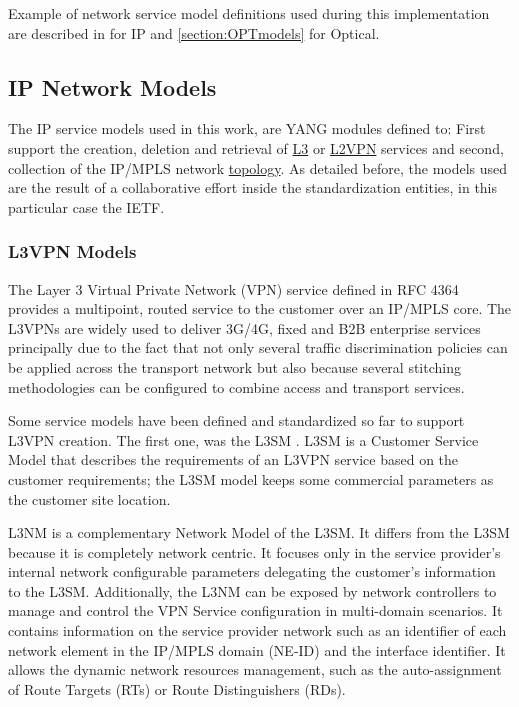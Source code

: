 \documentclass[a4paper,fleqn]{cas-dc}
\begin{document}
Example of network service model definitions used during this implementation are described in  for IP and \cref{section:OPTmodels} for Optical.

\subsection{IP Network Models}
\label{section:IPmodels}

The IP service models used in this work, are YANG modules defined to: First support the creation, deletion and retrieval of \hyperref[section:l3nm]{L3} or \hyperref[section:l2nm]{L2VPN} services and second, collection of the IP/MPLS network \hyperref[subsection:IPtopo]{topology}. As detailed before, the models used are the result of a collaborative effort inside the standardization entities, in this particular case the IETF.

\subsubsection{L3VPN Models}
\label{section:l3nm}
The Layer 3 Virtual Private Network (VPN) service defined in RFC 4364 \cite{rosen2006rfc} provides a multipoint, routed service to the customer over an IP/MPLS core. The L3VPNs are widely used to deliver 3G/4G, fixed and B2B enterprise services principally due to the fact that not only several traffic discrimination policies can be applied across the transport network but also because several stitching methodologies can be configured to combine access and transport services. 

Some service models have been defined and standardized so far to support L3VPN creation. The first one, was the L3SM \cite{rfc8299}. L3SM is a Customer Service Model that describes the requirements of an L3VPN service based on the customer requirements; the L3SM model keeps some commercial parameters as the customer site location.

L3NM \cite{voyer2019internet} is a complementary Network Model of the L3SM. It differs from the L3SM because it is completely network centric. It focuses only in the service provider's internal network configurable parameters delegating the customer's information to the L3SM. Additionally, the L3NM can be exposed by network controllers to manage and control the VPN Service configuration in multi-domain scenarios. It contains information on the service provider network such as an identifier of each network element in the IP/MPLS domain (NE-ID) and the interface identifier. It allows the dynamic network resources management, such as the auto-assignment of Route Targets (RTs) or Route Distinguishers (RDs).
\end{document}
